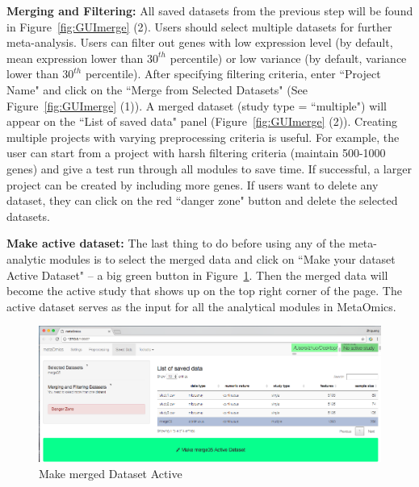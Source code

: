 \begin{steps}
\item \textbf{Merging and Filtering:}
All saved datasets from the previous step will be found in  Figure~\ref{fig:GUImerge} {\color{red} (2)}.
Users should select multiple datasets for further meta-analysis.
Users can filter out genes with low expression level (by default, mean expression lower than $30^{th}$ percentile)
or low variance (by default, variance lower than $30^{th}$ percentile).
After specifying filtering criteria, enter ``Project Name" and click on the ``Merge from Selected Datasets" (See Figure~\ref{fig:GUImerge} {\color{red} (1)}).
A merged dataset (study type = ``multiple") will appear on the ``List of saved data" panel (Figure~\ref{fig:GUImerge} {\color{red} (2)}).
Creating multiple projects with varying preprocessing criteria is useful.
For example, the user can start from a project with harsh filtering criteria (maintain 500-1000 genes) and give a test run through all modules to save time.
If successful, a larger project can be created by including more genes.
If users want to delete any dataset, they can click on the red ``danger zone" button and delete the selected datasets.

\item \textbf{Make active dataset:}
\label{sec:active}
The last thing to do before using any of the meta-analytic modules is to select the merged data and click on 
``Make your dataset Active Dataset" -- a big green button in Figure~\ref{fig:active}.
Then the merged data will become the active study that shows up on the top right corner of the page.
The active dataset serves as the input for all the analytical modules in MetaOmics.

\end{steps}







\begin{figure}[H]
\begin{center}
\includegraphics[scale=1]{./figure/preprocessing/GUImarkActive}
\caption{Make merged Dataset Active}
\label{fig:active}
\end{center}
\end{figure}





